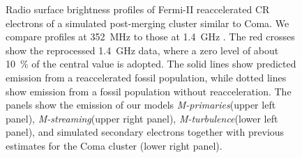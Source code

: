 \documentclass[fleqn,usenatbib,useAMS]{mnras}
\newcommand{\Mstream}{{\it M-streaming}\xspace}
\newcommand{\Mflatturb}{{\it M-turbulence}\xspace}
\newcommand{\Mprimary}{{\it M-primaries}\xspace}
\begin{document}
\begin{figure}
\begin{minipage}{1\columnwidth}
\begin{center}
   \end{center}
\end{minipage}
\caption{Radio surface brightness profiles of Fermi-II reaccelerated
  CR electrons of a simulated post-merging cluster similar to Coma. We
  compare profiles at 352~MHz \citep[blue lines and
    crosses,][]{brown11} to those at 1.4~GHz \citep[green lines and
    crosses,][]{deiss97}. The red crosses show the reprocessed 1.4~GHz
  data, where a zero level of about 10~\% of the central value is
  adopted. The solid lines show predicted emission from a
  reaccelerated fossil population, while dotted lines show emission
  from a fossil population without reacceleration. The panels show the
  emission of our models \Mprimary (upper left panel), \Mstream (upper
  right panel), \Mflatturb (lower left panel), and simulated secondary
  electrons together with previous estimates \citep{brunetti12} for
  the Coma cluster (lower right panel).}
  \label{fig:sync_profile}
\end{figure}
\end{document}
